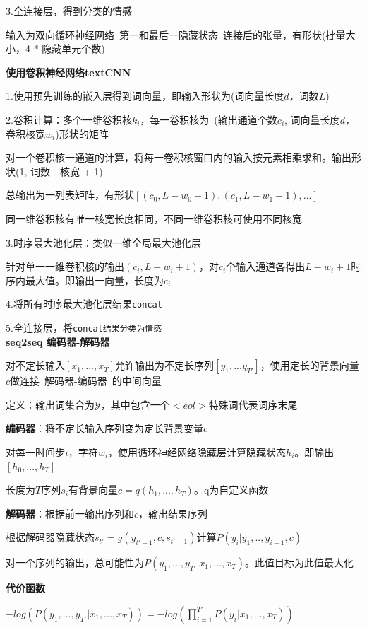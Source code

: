 \documentclass[UTF8]{ctexart}
\begin{document}
  \quad 3.全连接层，得到分类的情感

  \quad \quad 输入为双向循环神经网络\ 第一和最后一隐藏状态\ 连接后的张量，有形状(批量大小，4 * 隐藏单元个数)

  \textbf{使用卷积神经网络textCNN}

  \quad 1.使用预先训练的嵌入层得到词向量，即输入形状为(词向量长度$d$，词数$L$)

  \quad 2.卷积计算：多个一维卷积核$k_i$，每一卷积核为\ (输出通道个数$c_i$, 词向量长度$d$，卷积核宽$w_i$)形状的矩阵

  \quad \quad 对一个卷积核一通道的计算，将每一卷积核窗口内的输入按元素相乘求和。输出形状(1, 词数 - 核宽 + 1)

  \quad \quad 总输出为一列表矩阵，有形状$[(c_0, L - w_0 + 1), (c_1, L - w_1 + 1), ...]$

  \quad \quad 同一维卷积核有唯一核宽长度相同，不同一维卷积核可使用不同核宽

  \quad 3.时序最大池化层：类似一维全局最大池化层
  
  \quad \quad 针对单一一维卷积核的输出$(c_i, L - w_i + 1)$，对$c_i$个输入通道各得出$L - w_i + 1$时序内最大值。即输出一向量，长度为$c_i$
  
  \quad 4.将所有时序最大池化层结果\texttt{concat}

  \quad 5.全连接层，将\texttt{concat结果分类为情感}\\
\textbf{seq2seq 编码器-解码器}

  对不定长输入$[x_1, ..., x_T]$允许输出为不定长序列$[y_1,...y_{T'}]$，使用定长的背景向量$c$做连接\ 解码器-编码器\ 的中间向量

  定义：输出词集合为$\mathcal{Y} $，其中包含一个$<eol>$特殊词代表词序末尾

  \textbf{编码器}：将不定长输入序列变为定长背景变量$c$

  \quad 对每一时间步$i$，字符$w_i$，使用循环神经网络隐藏层计算隐藏状态$h_i$。即输出$[h_0, ..., h_T]$

  \quad 长度为$T$序列$s_i$有背景向量$c = q(h_1, ..., h_T)$。q为自定义函数

  \textbf{解码器}：根据前一输出序列和$c$，输出结果序列

  \quad 根据解码器隐藏状态$s_{t'} = g(y_{t'-1}, c, s_{t'-1})$计算$P(y_i | y_{1}, .., y_{i-1}, c)$
  
  \quad 对一个序列的输出，总可能性为$ P(y_1,...,y_{T'} | x_1, ..., x_T)$。此值目标为此值最大化

  \textbf{代价函数}

  \quad $-log(P(y_1,...,y_{T'} | x_1, ..., x_T)) = -log(\prod_{i=1}^{T'} P(y_i | x_1, ..., x_T))$
\end{document}
